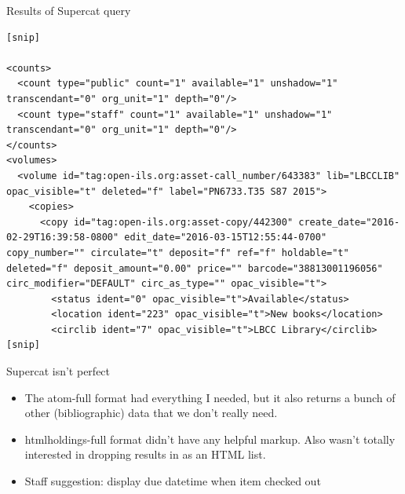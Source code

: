 \documentclass{beamer}
\begin{document}
\begin{frame}[fragile]{Results of Supercat query}

\begin{lstlisting}
[snip]

<counts>
  <count type="public" count="1" available="1" unshadow="1" transcendant="0" org_unit="1" depth="0"/>
  <count type="staff" count="1" available="1" unshadow="1" transcendant="0" org_unit="1" depth="0"/>
</counts>
<volumes>
  <volume id="tag:open-ils.org:asset-call_number/643383" lib="LBCCLIB" opac_visible="t" deleted="f" label="PN6733.T35 S87 2015">
    <copies>
      <copy id="tag:open-ils.org:asset-copy/442300" create_date="2016-02-29T16:39:58-0800" edit_date="2016-03-15T12:55:44-0700" copy_number="" circulate="t" deposit="f" ref="f" holdable="t" deleted="f" deposit_amount="0.00" price="" barcode="38813001196056" circ_modifier="DEFAULT" circ_as_type="" opac_visible="t">
        <status ident="0" opac_visible="t">Available</status>
        <location ident="223" opac_visible="t">New books</location>
        <circlib ident="7" opac_visible="t">LBCC Library</circlib>
[snip]
\end{lstlisting}
 
\end{frame}




\begin{frame}{Supercat isn't perfect}
 \begin{itemize}
  \item The atom-full format had everything I needed, but it also returns a bunch of other (bibliographic) data that we don't really need.
  \item htmlholdings-full format didn't have any helpful markup.  Also wasn't totally interested in dropping results in as an HTML list.
  \item Staff suggestion: display due datetime when item checked out
 \end{itemize}

\end{frame}
\end{document}
